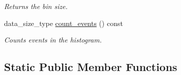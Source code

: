 \begin{DoxyCompactItemize}
\begin{DoxyCompactList}\small\item\em Returns the bin size. \end{DoxyCompactList}\item 
\hypertarget{a00284_abd504b4f85197308a6e49781252471e9}{}data\+\_\+size\+\_\+type \hyperlink{a00284_abd504b4f85197308a6e49781252471e9}{count\+\_\+events} () const \label{a00284_abd504b4f85197308a6e49781252471e9}

\begin{DoxyCompactList}\small\item\em Counts events in the histogram. \end{DoxyCompactList}\end{DoxyCompactItemize}
\subsection*{Static Public Member Functions}

